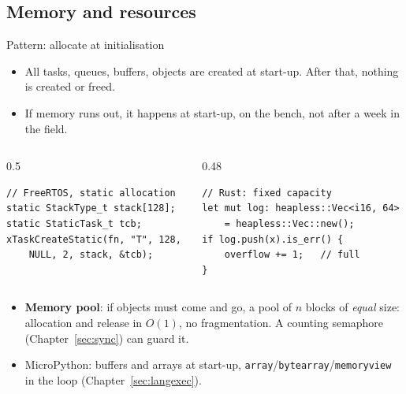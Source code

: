 \subsection{Memory and resources}
\begin{frame}[fragile]{Pattern: allocate at initialisation}
  \begin{itemize}
    \item All tasks, queues, buffers, objects are created at start-up. After that, nothing is created or freed.
    \item If memory runs out, it happens at start-up, on the bench, not after a week in the field.
  \end{itemize}
  \begin{columns}[T]
    \begin{column}{0.5\textwidth}
\begin{lstlisting}[numbers=none,basicstyle=\ttfamily\scriptsize]
// FreeRTOS, static allocation
static StackType_t stack[128];
static StaticTask_t tcb;
xTaskCreateStatic(fn, "T", 128,
    NULL, 2, stack, &tcb);
\end{lstlisting}
    \end{column}
    \begin{column}{0.48\textwidth}
\begin{lstlisting}[style=rust,numbers=none,basicstyle=\ttfamily\scriptsize]
// Rust: fixed capacity
let mut log: heapless::Vec<i16, 64>
    = heapless::Vec::new();
if log.push(x).is_err() {
    overflow += 1;   // full
}
\end{lstlisting}
    \end{column}
  \end{columns}
  \begin{itemize}
    \item \textbf{Memory pool}: if objects must come and go, a pool of $n$ blocks of \emph{equal} size: allocation and release in $O(1)$, no fragmentation. A counting semaphore (Chapter~\ref{sec:sync}) can guard it.
    \item MicroPython: buffers and arrays at start-up, \texttt{array}/\texttt{bytearray}/\texttt{memoryview} in the loop (Chapter~\ref{sec:langexec}).
  \end{itemize}
\end{frame}

